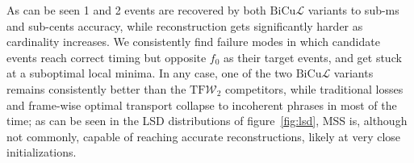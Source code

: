 \documentclass[conference]{IEEEtran}
\newcommand{\mss}{MSS}
\newcommand{\tfw}{\ensuremath{\mathrm{TF}\mathcal{W}_2}}
\newcommand{\bicul}{\ensuremath{\mathrm{BiCu}\mathcal{L}}}
\begin{document}
As can be seen 1 and 2 events are recovered by both \bicul{} variants to sub-ms and sub-cents accuracy, while reconstruction gets significantly harder as cardinality increases. We consistently find failure modes in which candidate events reach correct timing but opposite $f_0$ as their target events, and get stuck at a suboptimal local minima. In any case, one of the two \bicul{} variants remains consistently better than the \tfw{} competitors, while traditional losses and frame-wise optimal transport collapse to incoherent phrases in most of the time; as can be seen in the LSD distributions of figure~\ref{fig:lsd}, \mss{} is, although not commonly, capable of reaching accurate reconstructions, likely at very close initializations.
\end{document}
